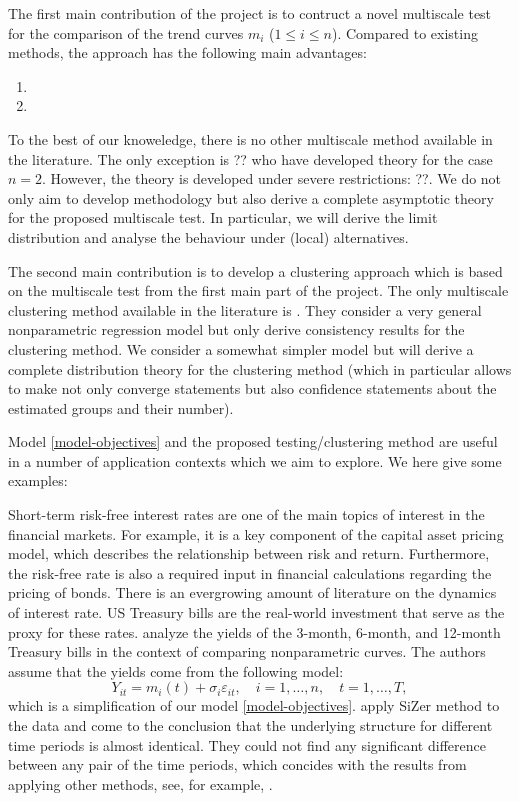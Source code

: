\documentclass[a4paper,12pt]{article}
\begin{document}
The first main contribution of the project is to contruct a novel multiscale test for the comparison of the trend curves $m_i$ ($1 \le i \le n$). Compared to existing methods, the approach has the following main advantages: 
\begin{enumerate}[label=(\arabic*),leftmargin=0.75cm]
\item 
\item 
\end{enumerate}
To the best of our knoweledge, there is no other multiscale method available in the literature. The only exception is ?? who have developed theory for the case $n=2$. However, the theory is developed under severe restrictions: ??.   
We do not only aim to develop methodology but also derive a complete asymptotic theory for the proposed multiscale test. In particular, we will derive the limit distribution and analyse the behaviour under (local) alternatives. 


The second main contribution is to develop a clustering approach which is based on the multiscale test from the first main part of the project. The only multiscale clustering method available in the literature is \cite*{VogtLinton2018}. They consider a very general nonparametric regression model but only derive consistency results for the clustering method. We consider a somewhat simpler model but will derive a complete distribution theory for the clustering method (which in particular allows to make not only converge statements but also confidence statements about the estimated groups and their number). 


Model \eqref{model-objectives} and the proposed testing/clustering method are useful in a number of application contexts which we aim to explore. We here give some examples: 

\begin{example}
Short-term risk-free interest rates are one of the main topics of interest in the financial markets. For example, it is a key component of the capital asset pricing model, which describes the relationship between risk and return. Furthermore, the risk-free rate is also a required input in financial calculations regarding the pricing of bonds. There is an evergrowing amount of literature on the dynamics of interest rate. US Treasury bills are the real-world investment that serve as the proxy for these rates. \cite{Park2009} analyze the yields of the 3-month, 6-month, and 12-month Treasury bills in the context of comparing nonparametric curves. The authors assume that the yields come from the following model:
\begin{equation}\label{model-park}
Y_{it} = m_i(t) + \sigma_i \varepsilon_{it}, \quad i=1,\ldots, n, \quad t=1,\ldots,T,
\end{equation}
which is a simplification of our model \eqref{model-objectives}. \cite{Park2009} apply Si{Z}er method to the data and come to the conclusion that the underlying structure for different time periods is almost identical. They could not find any significant difference between any pair of the time periods, which concides with the results from applying other methods, see, for example, \cite{Fan2008}.
\end{example}
\end{document}
